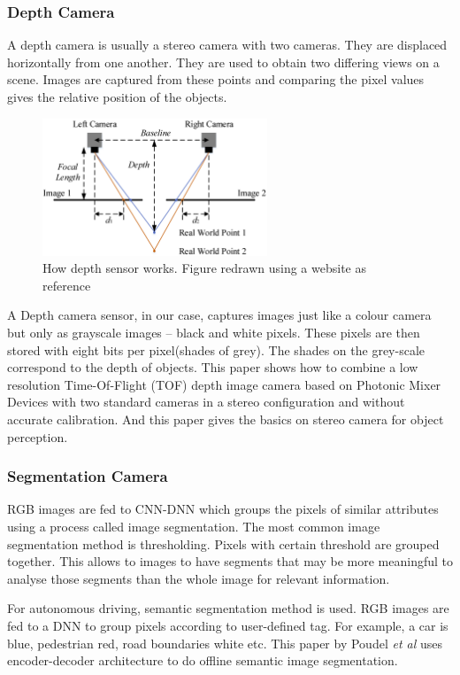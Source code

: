 \subsubsection*{Depth Camera}
A depth camera is usually a stereo camera with two cameras. They are displaced
horizontally from one another. They are used to obtain two differing views on a scene.
Images are captured from these points and comparing the pixel values gives the relative position of
the objects.
\begin{figure}[h]
	\centering
    \includegraphics[width=0.6\textwidth,
    scale=0.1]{figures/inkscape/depthsensor2.png}
    \caption{How depth sensor works. Figure redrawn using a website
    \cite{depthstereodiagramsource} as reference}
    \label{fig:depthcamera}
\end{figure}
A Depth camera sensor, in our case, captures images just like
a colour camera but only as grayscale images -- black and white pixels. These pixels are
then stored with eight bits per pixel(shades of grey). The shades on the grey-scale correspond to the depth of objects.
This paper \cite{depthsensorpaper1} shows how to combine  a  low  resolution
Time-Of-Flight  (TOF)  depth  image  camera based on Photonic Mixer Devices with two
standard cameras in a stereo configuration and without accurate calibration. And this
paper \cite{depthsensorpaper2} gives the basics on stereo camera for object perception.
\subsubsection*{Segmentation Camera}
RGB images are fed to CNN-DNN which groups the pixels of similar attributes using a
process called image segmentation. The most common image segmentation method is
thresholding. Pixels with certain threshold are grouped together. This allows to images to
have segments that may be more meaningful to analyse those segments than the whole image
for relevant information.

For autonomous driving, semantic segmentation method is used. RGB images are fed to a DNN
to group pixels according to user-defined tag. For example, a car is blue, pedestrian red, road boundaries white etc.
This paper by Poudel \textit{et al} \cite{segmentationpaper} uses encoder-decoder
architecture to do offline semantic image segmentation.

